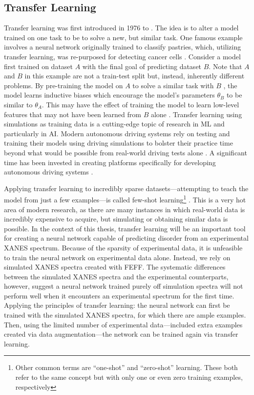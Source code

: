 \subsection{Transfer Learning}
Transfer learning was first introduced in 1976 to \cite{transferlearning-reminder} \cite{transferlearning2} \cite{transferlearning3}. The idea is to alter a model trained on one task to be to solve a new, but similar task. One famous example involves a neural network originally trained to classify pastries, which, utilizing transfer learning, was re-purposed for detecting cancer cells \cite{ny-pastry-article}. Consider a model first trained on dataset $ A $ with the final goal of predicting dataset $ B $. Note that $ A $ and $ B $ in this example are not a train-test split but, instead, inherently different problems. By pre-training the model on $ A $ to solve a similar task with $ B $ , the model learns inductive biases which encourage the model's parameters $ \theta_B $ to be similar to $ \theta_A $. This may have the effect of training the model to learn low-level features that may not have been learned from $ B $ alone  \cite{transferBook}. Transfer learning using simulations as training data is a cutting-edge topic of research in ML and particularly in AI. Modern autonomous driving systems rely on testing and training their models using driving simulations to bolster their practice time beyond what would be possible from real-world driving tests alone  \cite{mit-self-driving-car-simulations}. A significant time has been invested in creating platforms specifically for developing autonomous driving systems \cite{carla-dosovitskiy2017}. 

Applying transfer learning to incredibly sparse datasets---attempting to teach the model from just a few examples---is called few-shot learning\footnote{Other common terms are ``one-shot''  \cite{one-shot-learning} and ``zero-shot'' \cite{zero-shot-learning} learning. These both refer to the same concept but with only one or even zero training examples, respectively} \cite{few-shot-learning}. This is a very hot area of modern research, as there are many instances in which real-world data is incredibly expensive to acquire, but simulating or obtaining similar data is possible.
In the context of this thesis, transfer learning will be an important tool for creating a neural network capable of predicting disorder from an experimental XANES spectrum. Because of the sparsity of experimental data, it is unfeasible to train the neural network on experimental data alone. Instead, we rely on simulated XANES spectra created with FEFF. The systematic differences between the simulated XANES spectra and the experimental counterparts, however, suggest a neural network trained purely off simulation spectra will not perform well when it encounters an experimental spectrum for the first time. Applying the principles of transfer learning: the neural network can first be trained with the simulated XANES spectra, for which there are ample examples. Then, using the limited number of experimental data---included extra examples created via data augmentation---the network can be trained again via transfer learning.


